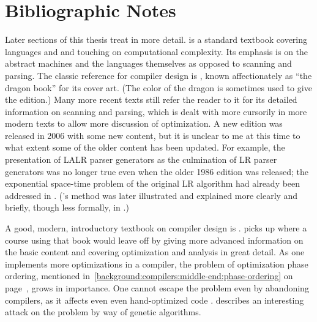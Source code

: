 \section{Bibliographic Notes}\label{background:conclusion:bibliographicnotes}
Later sections of this thesis treat \lambdacalc in more detail. %
 is a standard textbook covering languages and \TMs and touching on computational complexity. Its emphasis is on the abstract machines and the languages themselves as opposed to scanning and parsing. The classic reference for compiler design is \citet{Aho:Compilers:2006}, known affectionately as ``the dragon book'' for its cover art. (The color of the dragon is sometimes used to give the edition.) Many more recent texts still refer the reader to it for its detailed information on scanning and parsing, which is dealt with more cursorily in more modern texts to allow more discussion of optimization. A new edition was released in 2006 with some new content, but it is unclear to me at this time to what extent some of the older content has been updated. For example, the presentation of LALR parser generators as the culmination of LR parser generators was no longer true even when the older 1986 edition was released; the exponential space-time problem of the original LR algorithm had already been addressed in \citet{Pager:The-lane:1973}. ('s method was later illustrated and explained more clearly and briefly, though less formally, in \citet{Spector:Efficient:1988}.)

A good, modern, introductory textbook on compiler design is \citet{Cooper:Engineering:2004}.  picks up where a course using that book would leave off by giving more advanced information on the basic content and covering optimization and analysis in great detail. As one implements more optimizations in a compiler, the problem of optimization phase ordering, mentioned in~\ref{background:compilers:middle-end:phase-ordering} on page~\pageref{background:compilers:middle-end:phase-ordering}, grows in importance. One cannot escape the problem even by abandoning compilers, as it affects even even hand-optimized code \citep{Hines:Using:2005}.  describes an interesting attack on the problem by way of genetic algorithms.

